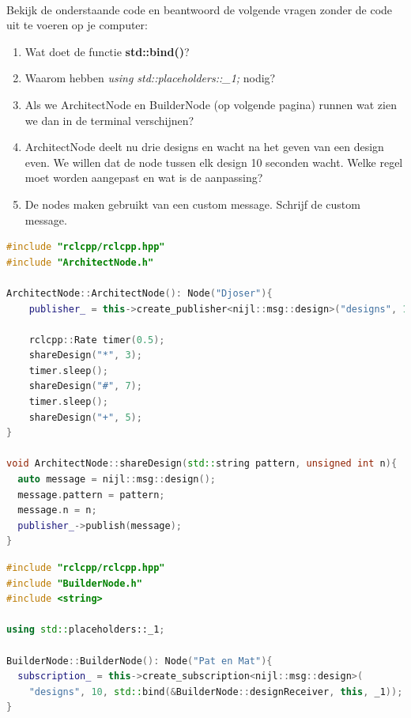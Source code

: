 \newpage

\begin{exercise}\mbox{}\\
Bekijk de onderstaande code en beantwoord de volgende vragen zonder de code uit te voeren op je computer:
\begin{enumerate}
\item Wat doet de functie \textbf{std::bind()}?
\item Waarom hebben \textit{using std::placeholders::\_1;} nodig?
\item Als we ArchitectNode en BuilderNode (op volgende pagina) runnen wat zien we dan in de terminal verschijnen?
\item ArchitectNode deelt nu drie designs en wacht na het geven van een design even. We willen dat de node tussen elk design 10 seconden wacht. Welke regel moet worden aangepast en wat is de aanpassing?
\item De nodes maken gebruikt van een custom message. Schrijf de custom message.
\end{enumerate}

\begin{minipage}{0.9\linewidth}
\begin{lstlisting}[language=C++, firstnumber=0]
#include "rclcpp/rclcpp.hpp"
#include "ArchitectNode.h"

ArchitectNode::ArchitectNode(): Node("Djoser"){
    publisher_ = this->create_publisher<nijl::msg::design>("designs", 10);

    rclcpp::Rate timer(0.5);
    shareDesign("*", 3);
    timer.sleep();
    shareDesign("#", 7);
    timer.sleep();
    shareDesign("+", 5);
}

void ArchitectNode::shareDesign(std::string pattern, unsigned int n){
  auto message = nijl::msg::design();
  message.pattern = pattern;
  message.n = n;
  publisher_->publish(message);
}
\end{lstlisting}
\end{minipage}

\begin{minipage}{0.9\linewidth}
\begin{lstlisting}[language=C++, firstnumber=0]
#include "rclcpp/rclcpp.hpp"
#include "BuilderNode.h"
#include <string>

using std::placeholders::_1;

BuilderNode::BuilderNode(): Node("Pat en Mat"){
  subscription_ = this->create_subscription<nijl::msg::design>(
    "designs", 10, std::bind(&BuilderNode::designReceiver, this, _1));
}


\end{lstlisting}
\end{minipage}
\end{exercise}
